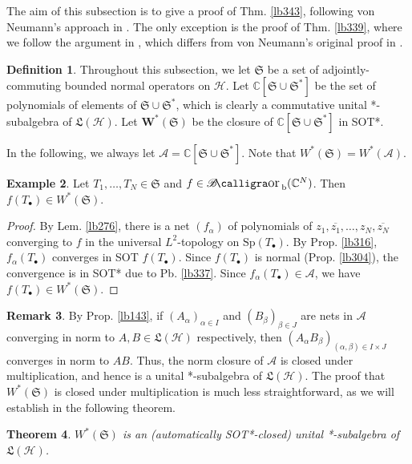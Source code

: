 \documentclass[12pt,b5paper,notitlepage]{article}
\theoremstyle{definition}
\newtheorem{df}{Definition}[subsection]
\newtheorem{eg}[df]{Example}
\newtheorem{rem}[df]{Remark}
\theoremstyle{plain}
\newtheorem{thm}[df]{Theorem}
\DeclareMathOperator{\Borb}{{\mathscr{B}\text{\kern -2pt {\calligra\large or}}\,}_{\mathrm b}}
\newcommand{\fk}{\mathfrak}
\newcommand{\ovl}{\overline}
\newcommand{\blt}{\bullet}
\newcommand{\Cbb}{\mathbb C}
\newcommand{\Sp}{\mathrm{Sp}}
\newcommand{\MH}{\mathcal H}
\newcommand{\SA}{\mathscr A}
\numberwithin{equation}{section}
\begin{document}
The aim of this subsection is to give a proof of Thm. \ref{lb343}, following von Neumann's approach in \cite{vN31}. The only exception is the proof of Thm. \ref{lb339}, where we follow the argument in \cite[Lem.\ II.2.8]{Dav}, which differs from von Neumann's original proof in \cite{vN29b}.






\begin{df}\label{lb336}
Throughout this subsection, we let $\fk S$ be a set of adjointly-commuting bounded normal operators on $\MH$. Let $\pmb{\Cbb[\fk S\cup\fk S^*]}$ be the set of polynomials of elements of $\fk S\cup\fk S^*$, which is clearly a commutative unital *-subalgebra of $\fk L(\MH)$. Let $\pmb {W^*(\fk S)}$ be the closure of $\Cbb[\fk S\cup\fk S^*]$ in SOT*.
\end{df}

In the following, we always let $\SA=\Cbb[\fk S\cup\fk S^*]$. Note that $W^*(\fk S)=W^*(\SA)$.

\begin{eg}\label{lb340}
Let $T_1,\dots,T_N\in\fk S$ and $f\in\Borb(\Cbb^N)$. Then $f(T_\blt)\in W^*(\fk S)$.
\end{eg}


\begin{proof}
By Lem. \ref{lb276}, there is a net $(f_\alpha)$ of polynomials of $z_1,\ovl{z_1},\dots,z_N,\ovl{z_N}$ converging to $f$ in the universal $L^2$-topology on $\Sp(T_\blt)$. By Prop. \ref{lb316}, $f_\alpha(T_\blt)$ converges in SOT $f(T_\blt)$. Since $f(T_\blt)$ is normal (Prop. \ref{lb304}), the convergence is in SOT* due to Pb. \ref{lb337}. Since $f_\alpha(T_\blt)\in\SA$, we have $f(T_\blt)\in W^*(\fk S)$.
\end{proof}


\begin{rem}
By Prop. \ref{lb143}, if $(A_\alpha)_{\alpha\in I}$ and $(B_\beta)_{\beta\in J}$ are nets in $\SA$ converging in norm to $A,B\in\fk L(\MH)$ respectively, then $(A_\alpha B_\beta)_{(\alpha,\beta)\in I\times J}$ converges in norm to $AB$. Thus, the norm closure of $\SA$ is closed under multiplication, and hence is a unital *-subalgebra of $\fk L(\MH)$. The proof that $W^*(\fk S)$ is closed under multiplication is much less straightforward, as we will establish in the following theorem.
\end{rem}


\begin{thm}\label{lb338}
$W^*(\fk S)$ is an (automatically SOT*-closed) unital *-subalgebra of $\fk L(\MH)$.
\end{thm}
\end{document}
